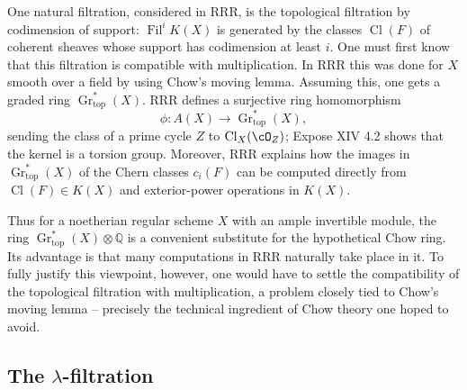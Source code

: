 \documentclass[11pt]{article}
\theoremstyle{plain}
\theoremstyle{definition}
\theoremstyle{remark}
\newcommand{\QQ}{\mathbb Q}
\DeclareMathOperator{\Gr}{Gr}
\providecommand{\Cl}{\operatorname{Cl}}
\providecommand{\Fil}{\operatorname{Fil}}
\begin{document}
One natural filtration, considered in RRR, is the topological filtration by codimension of support: $\Fil^iK(X)$ is generated by the classes $\Cl(F)$ of coherent sheaves whose support has codimension at least $i$. One must first know that this filtration is compatible with multiplication. In RRR this was done for $X$ smooth over a field by using Chow's moving lemma. Assuming this, one gets a graded ring $\Gr^*_{\mathrm{top}}(X)$. RRR defines a surjective ring homomorphism
\[
   \phi:A(X)\to\Gr^*_{\mathrm{top}}(X),
\]
sending the class of a prime cycle $Z$ to $\Cl_X(\cO_Z)$; Expose XIV 4.2 shows that the kernel is a torsion group. Moreover, RRR explains how the images in $\Gr^*_{\mathrm{top}}(X)$ of the Chern classes $c_i(F)$ can be computed directly from $\Cl(F)\in K(X)$ and exterior-power operations in $K(X)$.

Thus for a noetherian regular scheme $X$ with an ample invertible module, the ring $\Gr^*_{\mathrm{top}}(X)\otimes\QQ$ is a convenient substitute for the hypothetical Chow ring. Its advantage is that many computations in RRR naturally take place in it. To fully justify this viewpoint, however, one would have to settle the compatibility of the topological filtration with multiplication, a problem closely tied to Chow's moving lemma -- precisely the technical ingredient of Chow theory one hoped to avoid.

\subsection{The $\lambda$-filtration}
\end{document}

